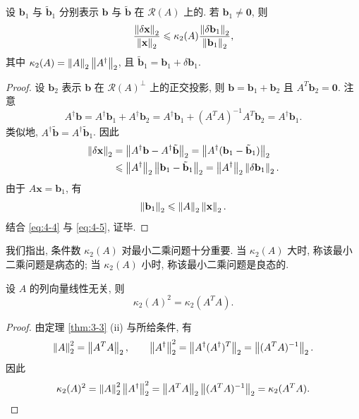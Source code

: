 \begin{theorem}
\label{thm:4-5}
设 $\mathbf{b}_1$ 与 $\tilde{\mathbf{b}}_1$ 分别表示 $\mathbf{b}$ 与 $\tilde{\mathbf{b}}$ 在 $\mathcal{R}(A)$ 上的. 若 $\mathbf{b}_1\neq\mathbf{0}$, 则
\[
  \frac{\left\|\delta\mathbf{x}\right\|_2}{\left\|\mathbf{x}\right\|_2}
  \leqslant\kappa_2(A)\frac{\left\|\delta\mathbf{b}_1\right\|_2}{\left\|\mathbf{b}_1\right\|_2},
\]
其中 $\kappa_2(A)=\left\|A\right\|_2\left\|A^{\dagger}\right\|_2$, 且 $\tilde{\mathbf{b}}_1=\mathbf{b}_1+\delta\mathbf{b}_1$.
\end{theorem}

\begin{proof}
设 $\mathbf{b}_2$ 表示 $\mathbf{b}$ 在 $\mathcal{R}(A)^{\perp}$ 上的正交投影, 则 $\mathbf{b}=\mathbf{b}_1+\mathbf{b}_2$ 且 $A^T\mathbf{b}_2=\mathbf{0}$. 注意
\[
  A^{\dagger}\mathbf{b}=A^{\dagger}\mathbf{b}_1+A^{\dagger}\mathbf{b}_2
  =A^{\dagger}\mathbf{b}_1+(A^TA)^{-1}A^T\mathbf{b}_2
  =A^{\dagger}\mathbf{b}_1.
\]
类似地, $A^{\dagger}\tilde{\mathbf{b}}=A^{\dagger}\tilde{\mathbf{b}}_1$. 因此
\begin{align}
  \left\|\delta\mathbf{x}\right\|_2
  &=\left\|A^{\dagger}\mathbf{b}-A^{\dagger}\tilde{\mathbf{b}}\right\|_2
   =\left\|A^{\dagger}(\mathbf{b}_1-\tilde{\mathbf{b}}_1)\right\|_2\notag\\
  &\leqslant\left\|A^{\dagger}\right\|_2\left\|\mathbf{b}_1-\tilde{\mathbf{b}}_1\right\|_2
   =\left\|A^{\dagger}\right\|_2\left\|\delta\mathbf{b}_1\right\|_2.
   \label{eq:4-4}
\end{align}
由于 $A\mathbf{x}=\mathbf{b}_1$, 有
\begin{equation}
  \left\|\mathbf{b}_1\right\|_2\leqslant\left\|A\right\|_2\left\|\mathbf{x}\right\|_2.
  \label{eq:4-5}
\end{equation}
结合 \eqref{eq:4-4} 与 \eqref{eq:4-5}, 证毕.
\end{proof}

我们指出, 条件数 $\kappa_2(A)$ 对最小二乘问题十分重要. 当 $\kappa_2(A)$ 大时, 称该最小二乘问题是病态的; 当 $\kappa_2(A)$ 小时, 称该最小二乘问题是良态的.

\begin{theorem}
\label{thm:4-6}
设 $A$ 的列向量线性无关, 则
\[
  \kappa_2(A)^2=\kappa_2(A^TA).
\]
\end{theorem}

\begin{proof}
由定理 \ref{thm:3-3} (ii) 与所给条件, 有
\[
  \left\|A\right\|_2^2=\left\|A^TA\right\|_2,\qquad
  \left\|A^{\dagger}\right\|_2^2=\left\|A^{\dagger}(A^{\dagger})^T\right\|_2
  =\left\|(A^TA)^{-1}\right\|_2.
\]
因此
\[
  \kappa_2(A)^2=\left\|A\right\|_2^2\left\|A^{\dagger}\right\|_2^2
  =\left\|A^TA\right\|_2\left\|(A^TA)^{-1}\right\|_2=\kappa_2(A^TA). \qedhere
\]
\end{proof}

